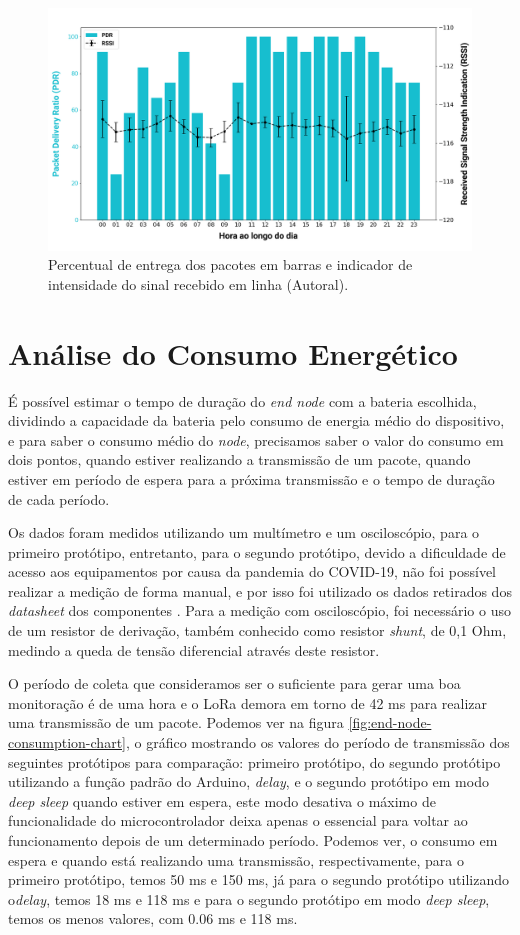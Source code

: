 \begin{figure}[H]
  \centering
  \includegraphics[width=.80\textwidth]{assets/21-04-2020-pdr-rssi.png} 
  \caption{Percentual de entrega dos pacotes em barras e indicador de intensidade do sinal recebido em linha (Autoral).}
  \label{fig:21-04-2020-pdr-rssi} 
\end{figure}

\section{Análise do Consumo Energético}
\label{result:consumo}
É possível estimar o tempo de duração do \textit{end node} com a bateria escolhida, dividindo a capacidade da bateria pelo consumo de energia médio do dispositivo, e para saber o consumo médio do \textit{node}, precisamos saber o valor do consumo em dois pontos, quando estiver realizando a transmissão de um pacote,  quando estiver em período de espera para a próxima transmissão e o tempo de duração de cada período.

Os dados foram medidos utilizando um multímetro e um osciloscópio, para o primeiro protótipo, entretanto, para o segundo protótipo, devido a dificuldade de acesso aos equipamentos por causa da pandemia do COVID-19, não foi possível realizar a medição de forma manual, e por isso foi utilizado os dados retirados dos \textit{datasheet} dos componentes \cite{datasheetDHT22, datasheetATmega328P, datasheetLoRa}. Para a medição com osciloscópio, foi necessário o uso de um resistor de derivação, também conhecido como resistor \textit{shunt}, de 0,1 Ohm, medindo a queda de tensão diferencial através deste resistor.

O período de coleta que consideramos ser o suficiente para gerar uma boa monitoração é de uma hora e o LoRa demora em torno de 42 ms para realizar uma transmissão de um pacote. Podemos ver na figura \ref{fig:end-node-consumption-chart}, o gráfico mostrando os valores do período de transmissão dos seguintes protótipos para comparação: primeiro protótipo, do segundo protótipo utilizando a função padrão do Arduino, \textit{delay}, e o segundo protótipo em modo \textit{deep sleep} quando estiver em espera, este modo desativa o máximo de funcionalidade do microcontrolador deixa apenas o essencial para voltar ao funcionamento depois de um determinado período. Podemos ver, o consumo em espera e quando está realizando uma transmissão, respectivamente, para o primeiro protótipo, temos 50 ms e 150 ms, já para o segundo protótipo utilizando o\textit{delay}, temos 18 ms e 118 ms e para o segundo protótipo em modo  \textit{deep sleep}, temos os menos valores, com 0.06 ms e 118 ms.

